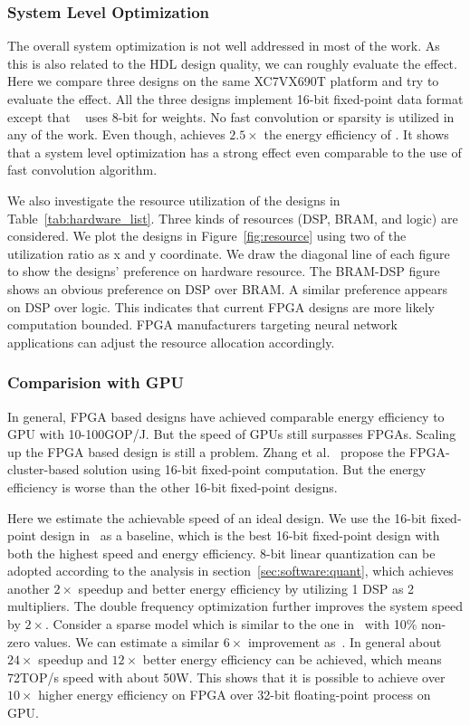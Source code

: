 \subsubsection*{\textbf{System Level Optimization}} The overall system optimization is not well addressed in most of the work. As this is also related to the HDL design quality, we can roughly evaluate the effect. Here we compare three designs\cite{zhang2016caffeine, liu2016automatic, li2016high} on the same XC7VX690T platform and try to evaluate the effect. All the three designs implement 16-bit fixed-point data format except that ~\cite{liu2016automatic} uses 8-bit for weights. No fast convolution or sparsity is utilized in any of the work. Even though, \cite{li2016high} achieves $2.5\times$ the energy efficiency of \cite{liu2016automatic}. It shows that a system level optimization has a strong effect even comparable to the use of fast convolution algorithm. 

We also investigate the resource utilization of the designs in Table~\ref{tab:hardware_list}. Three kinds of resources (DSP, BRAM, and logic) are considered. We plot the designs in Figure~\ref{fig:resource} using two of the utilization ratio as x and y coordinate. We draw the diagonal line of each figure to show the designs' preference on hardware resource. The BRAM-DSP figure shows an obvious preference on DSP over BRAM. A similar preference appears on DSP over logic. This indicates that current FPGA designs are more likely computation bounded. FPGA manufacturers targeting neural network applications can adjust the resource allocation accordingly.

\subsubsection*{\textbf{Comparision with GPU}} In general, FPGA based designs have achieved comparable energy efficiency to GPU with 10-100GOP/J. But the speed of GPUs still surpasses FPGAs. Scaling up the FPGA based design is still a problem. Zhang et al.~\cite{zhang2016energy} propose the FPGA-cluster-based solution using 16-bit fixed-point computation. But the energy efficiency is worse than the other 16-bit fixed-point designs. 

Here we estimate the achievable speed of an ideal design. We use the 16-bit fixed-point design in~\cite{lu2017evaluating} as a baseline, which is the best 16-bit fixed-point design with both the highest speed and energy efficiency. 8-bit linear quantization can be adopted according to the analysis in section~\ref{sec:software:quant}, which achieves another $2\times$ speedup and better energy efficiency by utilizing 1 DSP as 2 multipliers. The double frequency optimization further improves the system speed by $2\times$. Consider a sparse model which is similar to the one in~\cite{han2017ese} with 10\% non-zero values. We can estimate a similar $6\times$ improvement as~\cite{han2017ese}. In general about $24\times$ speedup and $12\times$ better energy efficiency can be achieved, which means 72TOP/s speed with about 50W. This shows that it is possible to achieve over $10\times$ higher energy efficiency on FPGA over 32-bit floating-point process on GPU.


